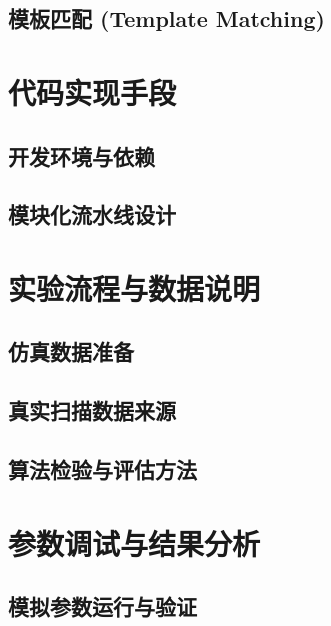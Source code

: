 \documentclass[a4paper, 11pt]{ctexart}
\begin{document}
\subsection{模板匹配 (Template Matching)}

\section{代码实现手段}
\subsection{开发环境与依赖}
\subsection{模块化流水线设计}

\section{实验流程与数据说明}
\subsection{仿真数据准备}
\subsection{真实扫描数据来源}
\subsection{算法检验与评估方法}

\section{参数调试与结果分析}
\subsection{模拟参数运行与验证}
\end{document}
